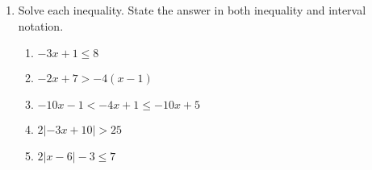 \documentclass[12pt]{article}
\begin{document}
\begin{enumerate}
\begin{enumerate}
		\end{enumerate}
	\item Solve each inequality. State the answer in both inequality and interval notation.
		\begin{enumerate}
			\item $-3x+1\leq 8$\vskip 1in
			\item $-2x+7 > -4(x-1)$\vskip 1in
			\item $-10x-1 < -4x+1 \leq -10x+5$\vfill
			\item $2|-3x+10|>25$\vfill
			\item $2|x-6|-3\leq 7$\vfill
		\end{enumerate}
\end{enumerate}
\end{document}
